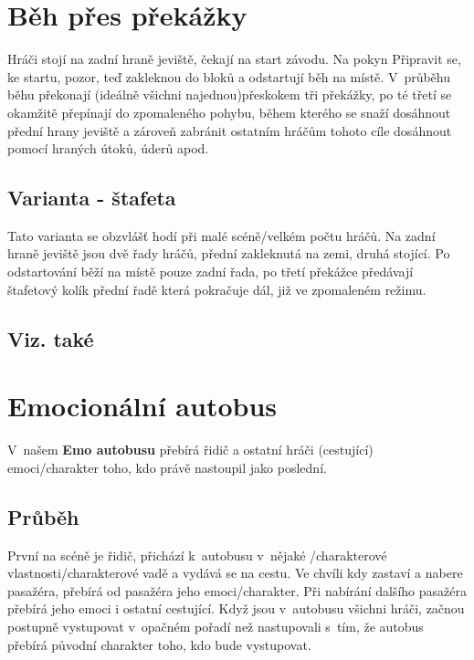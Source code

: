\needspace{5cm} \section{Běh přes překážky} \label{běh přes překážky} Hráči stojí na zadní hraně jeviště, čekají na start závodu. Na pokyn  Připravit se, ke startu, pozor, teď   zakleknou do bloků a odstartují běh na místě. V~průběhu běhu překonají (ideálně všichni najednou)přeskokem tři překážky, po té třetí se okamžitě přepínají do zpomaleného pohybu, během kterého se snaží dosáhnout přední hrany jeviště a zároveň zabránit ostatním hráčům tohoto cíle dosáhnout pomocí hraných útoků, úderů apod. 
 
\subsection{Varianta - štafeta} Tato varianta se obzvlášť hodí při malé scéně/velkém počtu hráčů. 
Na zadní hraně jeviště jsou dvě řady hráčů, přední zakleknutá na zemi, druhá stojící. Po odstartování běží na místě pouze zadní řada, po třetí překážce předávají štafetový kolík přední řadě která pokračuje dál, již ve zpomaleném režimu. 
 
\subsection{Viz. také}  
 
 
\needspace{5cm} \section{Emocionální autobus} \label{emocionální autobus}  
 
V~našem \textbf{Emo autobusu} přebírá řidič a ostatní hráči (cestující) emoci/charakter toho, kdo právě nastoupil jako poslední.  
 
\subsection{Průběh} První na scéně je řidič, přichází k~autobusu v~nějaké /charakterové vlastnosti/charakterové vadě a vydává se na cestu. Ve chvíli kdy zastaví a nabere pasažéra, přebírá od pasažéra jeho emoci/charakter. Při nabírání dalšího pasažéra přebírá jeho emoci i ostatní cestující. Když jsou v~autobusu všichni hráči, začnou postupně vystupovat v~opačném pořadí než nastupovali s~tím, že autobus přebírá původní charakter toho, kdo bude vystupovat. 
 
